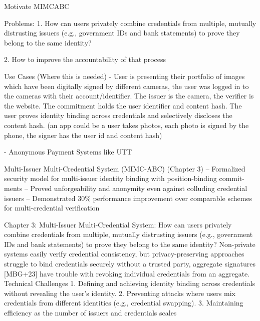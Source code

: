 \label{sec:mimc}

Motivate MIMCABC

Problems: 
1. How can users privately combine credentials from multiple, mutually distrusting issuers (e.g., government IDs and bank statements) to prove they belong to the same identity?

2. How to improve the accountability of that process

Use Cases (Where this is needed)
- User is presenting their portfolio of images which have been digitally signed by different cameras, the user was logged in to the cameras with their account/identifier. 
The issuer is the camera, the verifier is the website. 
The commitment holds the user identifier and content hash. 
The user proves identity binding across credentials and selectively discloses the content hash.
(an app could be a user takes photos, each photo is signed by the phone, the signer has the user id and content hash)

- Anonymous Payment Systems like UTT




















Multi-Issuer Multi-Credential System (MIMC-ABC) (Chapter 3)
– Formalized security model for multi-issuer identity binding with position-binding commit-
ments
– Proved unforgeability and anonymity even against colluding credential issuers
– Demonstrated 30\% performance improvement over comparable schemes for multi-credential
verification


Chapter 3: Multi-Issuer Multi-Credential System: How can users privately combine credentials from multiple, mutually distrusting issuers (e.g., government IDs and bank statements) to prove they belong to the same identity? Non-private systems easily verify credential consistency, but privacy-preserving approaches struggle to bind credentials securely without
a trusted party, aggregate signatures [MBG+23] have trouble with revoking individual credentials from an aggregate.
Technical Challenges
1. Defining and achieving identity binding across credentials without revealing the user’s identity.
2. Preventing attacks where users mix credentials from different identities (e.g., credential swapping).
3. Maintaining efficiency as the number of issuers and credentials scales

